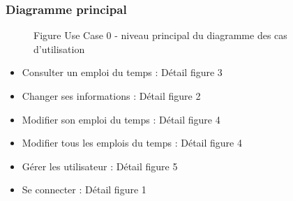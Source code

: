 \documentclass[a4paper, 11pt]{article}
\begin{document}
        \subsubsection{ Diagramme principal}
        \begin{figure}[h]
        \caption{Figure Use Case 0 - niveau principal du diagramme des cas d'utilisation}
        \label{fig-diag-use-case-0}
        \end{figure}
        \begin{itemize}
        \item Consulter un emploi du temps       : Détail figure 3
        \item Changer ses informations           : Détail figure 2
        \item Modifier son emploi du temps       : Détail figure 4
        \item Modifier tous les emplois du temps : Détail figure 4
        \item Gérer les utilisateur              : Détail figure 5
        \item Se connecter                       : Détail figure 1
        \end{itemize}
	\clearpage
\end{document}

